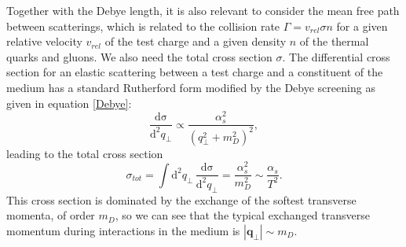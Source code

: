 \documentclass[a4paper,12pt]{article}
\numberwithin{equation}{section}
\begin{document}
Together with the Debye length, it is also relevant to consider the mean free path between scatterings, which is related to the collision rate $\Gamma=v_{rel}\sigma n $ for a given relative velocity $v_{rel}$ of the test charge and a given density $n$ of the thermal quarks and gluons. We also need the total cross section $\sigma$. The differential cross section for an elastic scattering between a test charge and a constituent of the medium has a standard Rutherford form modified by the Debye screening as given in equation \eqref{Debye}:
\begin{equation}
\frac{\mathrm{d\sigma}}{\mathrm{d}^2q_\perp}\propto\frac{\alpha_s^2}{(q_\perp^2+m_D^2)^2},
\end{equation}
leading to the total cross section 
\begin{equation}
\sigma_{tot}=\int \mathrm{d}^2q_\perp\,\frac{\mathrm{d\sigma}}{\mathrm{d}^2q_\perp}=\frac{\alpha_s^2}{m_D^2}\sim\frac{\alpha_s}{T^2}.
\end{equation}
This cross section is dominated by the exchange of the softest transverse momenta, of order $m_D$, so we can see that the typical exchanged transverse momentum during interactions in the medium is $|\mathbf{q}_\perp|\sim m_D$. 
\end{document}
